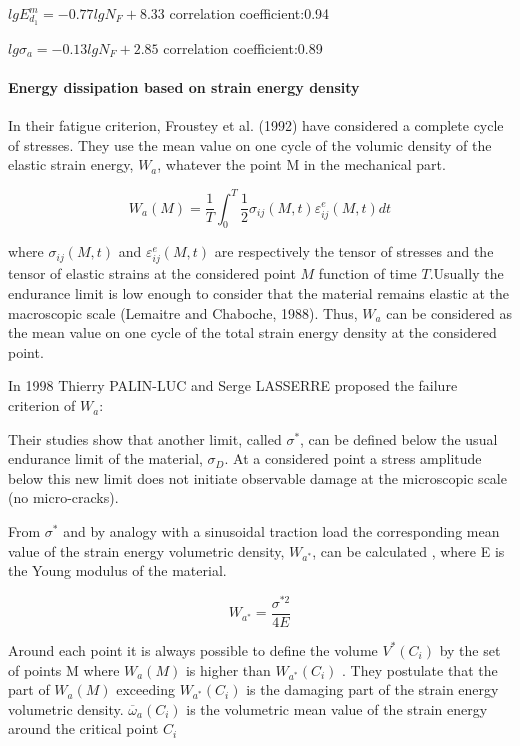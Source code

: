 \documentclass[3p,times,procedia,number]{elsarticle}
\begin{document}
         $lgE_{d_1}^m=-0.77lgN_F+8.33$ correlation coefficient:0.94
         
         $lg\sigma_a=-0.13lgN_F+2.85$ correlation coefficient:0.89
         
         
\paragraph{Energy dissipation based on strain energy density}

         In their fatigue criterion, Froustey et al. (1992)  have considered a complete cycle of
         stresses. They use the mean value on one cycle of
         the volumic density of the elastic strain energy, $W_a$, whatever the point
         M in the mechanical part.
         
         $$W_a(M)=\frac{1}{T}\int_{0}^{T}\frac{1}{2}\sigma_{ij}(M,t)\varepsilon_{ij}^e(M,t)dt$$
         
         where $\sigma_{ij}(M,t)$ and $\varepsilon_{ij}^e(M,t)$ are respectively the tensor of stresses and the tensor of
         elastic strains at the considered point $M$ function of time $T$.Usually the endurance limit
         is low enough to consider that the material remains elastic at the macroscopic scale
         (Lemaitre and Chaboche, 1988). Thus, $W_a$ can be considered as the mean value on one
         cycle of the total strain energy density at the considered point.
         
         In 1998 Thierry PALIN-LUC and Serge LASSERRE \cite{palin1998energy} proposed the failure criterion of $W_a$:
         
         Their studies show that another limit, called $\sigma^*$, can be defined below
         the usual endurance limit of the material, $\sigma_D$. At a considered point a stress amplitude
         below this new limit does not initiate observable damage at the microscopic scale (no
         micro-cracks).
         
         From $\sigma^*$ and by analogy with a sinusoidal traction load the corresponding mean value
         of the strain energy volumetric density, $W_{a^*}$, can be calculated , where E is the
         Young modulus of the material.
         
         $$W_{a^*}=\frac{\sigma^{*2}}{4E}$$
         
         Around each point it is always possible to define
         the volume $V^* (C_i)$ by the set of points M where $W_a (M)$ is higher than $W_{a^*} (C_i)$
         . They postulate that the part of $W_a (M)$ exceeding $W_{a^*} (C_i)$ is the damaging part
         of the strain energy volumetric density.  $\overline{\omega}_a(C_i)$ is
         the volumetric mean value of the strain energy around the critical point $C_i$
         
\end{document}
